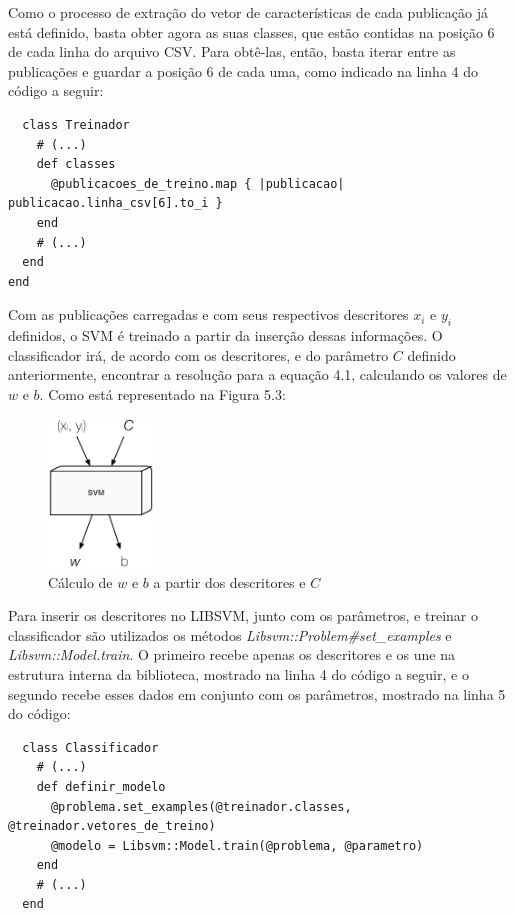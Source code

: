 Como o processo de extração do vetor de características de cada publicação já está definido, basta obter agora as suas classes, que estão contidas na posição 6 de cada linha do arquivo CSV. Para obtê-las, então, basta iterar entre as publicações e guardar a posição 6 de cada uma, como indicado na linha 4 do código a seguir:

\begin{lstlisting}
  class Treinador
    # (...)
    def classes
      @publicacoes_de_treino.map { |publicacao| publicacao.linha_csv[6].to_i }
    end
    # (...)
  end
end
\end{lstlisting}

Com as publicações carregadas e com seus respectivos descritores ${x}_{i}$ e ${y}_{i}$ definidos, o SVM é treinado a partir da inserção dessas informações. O classificador irá, de acordo com os descritores, e do parâmetro $C$ definido anteriormente, encontrar a resolução para a equação 4.1, calculando os valores de $w$ e $b$. Como está representado na Figura 5.3:

\begin{figure}[htpb]
  \begin{center}
    \includegraphics[width=0.25\textwidth]{figuras/svm-extracaowb.eps}
    \caption{Cálculo de $w$ e $b$ a partir dos descritores e $C$}
  \end{center}
\end{figure}

Para inserir os descritores no LIBSVM, junto com os parâmetros, e treinar o classificador são utilizados os métodos \textit{Libsvm::Problem\#set\_examples} e \textit{Libsvm::Model.train}. O primeiro recebe apenas os descritores e os une na estrutura interna da biblioteca, mostrado na linha 4 do código a seguir, e o segundo recebe esses dados em conjunto com os parâmetros, mostrado na linha 5 do código:

\begin{lstlisting}
  class Classificador
    # (...)
    def definir_modelo
      @problema.set_examples(@treinador.classes, @treinador.vetores_de_treino)
      @modelo = Libsvm::Model.train(@problema, @parametro)
    end
    # (...)
  end
\end{lstlisting}

